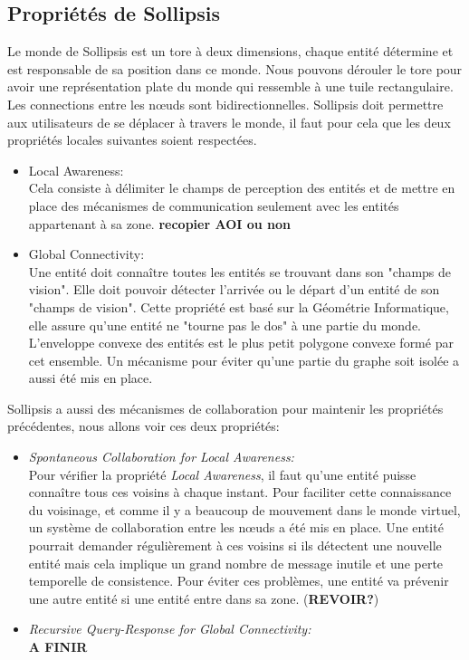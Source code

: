 	\subsection{Propriétés de Sollipsis}
	Le monde de Sollipsis est un tore à deux dimensions, chaque entité détermine et est responsable de sa position dans ce monde. Nous pouvons dérouler le tore pour avoir une représentation plate du monde qui ressemble à une tuile rectangulaire. Les connections entre les nœuds sont bidirectionnelles. Sollipsis doit permettre aux utilisateurs de se déplacer à travers le monde, il faut pour cela que les deux propriétés locales suivantes soient respectées.
	\begin{itemize}
		\item Local Awareness:\\
		Cela consiste à délimiter le champs de perception des entités et de mettre en place des mécanismes de communication seulement avec les entités appartenant à sa zone. \textbf{recopier AOI ou non }
		\item Global Connectivity:\\
		Une entité doit connaître toutes les entités se trouvant dans son "champs de vision". Elle doit pouvoir détecter l'arrivée ou le départ d'un entité de son "champs de vision". Cette propriété est basé sur la Géométrie Informatique, elle assure qu'une entité ne "tourne pas le dos" à une partie du monde. L'enveloppe convexe des entités est le plus petit polygone convexe formé par cet ensemble. Un mécanisme pour éviter qu'une partie du graphe soit isolée a aussi été mis en place.
	\end{itemize} 
	Sollipsis a aussi des mécanismes de collaboration pour maintenir les propriétés précédentes, nous allons voir ces deux propriétés:
	\begin{itemize}
		\item \textit{Spontaneous Collaboration for Local Awareness:}\\
		Pour vérifier la propriété \textit{Local Awareness}, il faut qu'une entité puisse connaître tous ces voisins à chaque instant. Pour faciliter cette connaissance du voisinage, et comme il y a beaucoup de mouvement dans le monde virtuel, un système de collaboration entre les nœuds a été mis en place. Une entité pourrait demander régulièrement à ces voisins si ils détectent une nouvelle entité mais cela implique un grand nombre de message inutile et une perte temporelle de consistence. Pour éviter ces problèmes, une entité va prévenir une autre entité si une entité entre dans sa zone. (\textbf{REVOIR?}) 
		\item \textit{Recursive Query-Response for Global Connectivity:}\\
		\textbf{A FINIR}
	\end{itemize}
